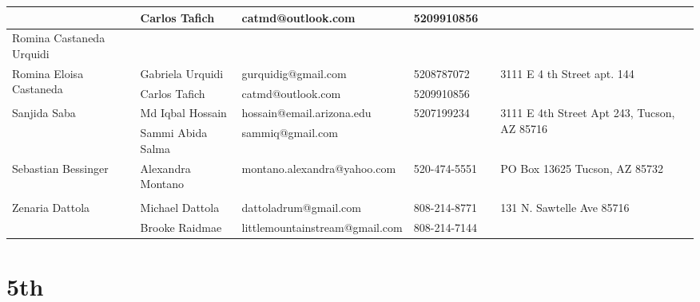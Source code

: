 \documentclass[landscape]{article}\usepackage[]{graphicx}\usepackage[]{color}
\begin{document}
\begin{longtable}{|p{100pt}|p{100pt}|p{140pt}|p{60pt}|p{64pt}|p{120pt}|}
 & Carlos Tafich & catmd@outlook.com & 5209910856 &  & \\
\hline
\multirow{2}{100pt}{Romina Castaneda Urquidi} &  &  &  &  & \multirow{2}{120pt}{} \\
 &  &  &  &  & \\
\hline
\multirow{2}{100pt}{Romina Eloisa Castaneda} & Gabriela Urquidi & gurquidig@gmail.com & 5208787072 &  & \multirow{2}{120pt}{3111 E 4 th Street apt. 144} \\
 & Carlos Tafich & catmd@outlook.com & 5209910856 &  & \\
\hline
\multirow{2}{100pt}{Sanjida Saba} & Md Iqbal Hossain & hossain@email.arizona.edu & 5207199234 &  & \multirow{2}{120pt}{3111 E 4th Street Apt 243, Tucson, AZ 85716} \\
 & Sammi Abida Salma & sammiq@gmail.com &  &  & \\
\hline
\multirow{2}{100pt}{Sebastian Bessinger} & Alexandra Montano & montano.alexandra@yahoo.com & 520-474-5551 &  & \multirow{2}{120pt}{PO Box 13625 Tucson, AZ 85732} \\
 &  &  &  &  & \\
\hline
\multirow{2}{100pt}{Zenaria Dattola} & Michael Dattola & dattoladrum@gmail.com & 808-214-8771 &  & \multirow{2}{120pt}{131 N. Sawtelle Ave 85716} \\
 & Brooke Raidmae & littlemountainstream@gmail.com & 808-214-7144 &  & \\
\hline
\end{longtable}
\newpage
\section{5th}
\end{document}
